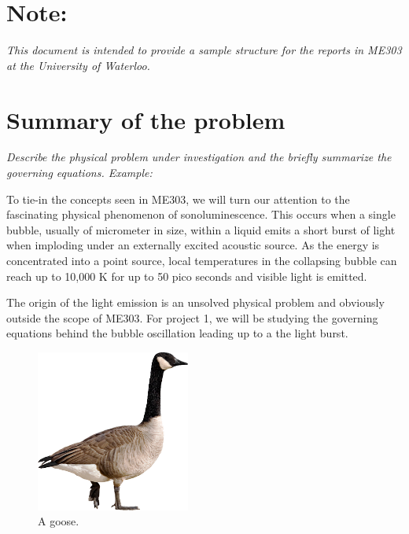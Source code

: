 \documentclass[12pt]{article}
\begin{document}



\tableofcontents
\newpage

\section*{Note:}
\emph{This document is intended to provide a sample structure for the reports in ME303 at the University of Waterloo. }

\section{Summary of the problem}
\emph{Describe the physical problem under investigation and the briefly summarize the governing equations. Example:}

To tie-in the concepts seen in ME303, we will turn our attention to the fascinating physical phenomenon of sonoluminescence. This occurs when a single bubble, usually of micrometer in size, within a liquid emits a short burst of light when imploding under an externally excited acoustic source. As the energy is concentrated into a point source, local temperatures in the collapsing bubble can reach up to 10,000 K for up to 50 pico seconds and visible light is emitted.

The origin of the light emission is an unsolved physical problem and obviously outside the scope of ME303. For project 1, we will be studying the governing equations behind the bubble oscillation leading up to a the light burst.
\begin{figure}[h!]
\centering
\includegraphics[width=0.45\textwidth]{figures/goose.png} 
\caption{A goose.}
\label{goose}
\end{figure}
\end{document}
